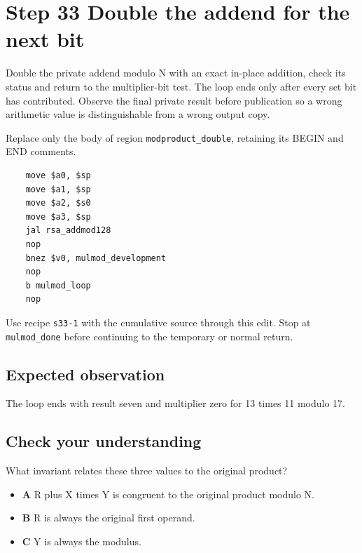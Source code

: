 \section{Step 33 Double the addend for the next bit}\label{rsa-s33}

Double the private addend modulo N with an exact in-place addition, check its status and return to the multiplier-bit test. The loop ends only after every set bit has contributed. Observe the final private result before publication so a wrong arithmetic value is distinguishable from a wrong output copy.

Replace only the body of region \texttt{modproduct\_double}, retaining its BEGIN and END comments.

\begin{verbatim}
    move $a0, $sp
    move $a1, $sp
    move $a2, $s0
    move $a3, $sp
    jal rsa_addmod128
    nop
    bnez $v0, mulmod_development
    nop
    b mulmod_loop
    nop
\end{verbatim}

Use recipe \texttt{s33-1} with the cumulative source through this edit. Stop at \texttt{mulmod\_done} before continuing to the temporary or normal return.

\subsection{Expected observation}
The loop ends with result seven and multiplier zero for 13 times 11 modulo 17.

\subsection{Check your understanding}
What invariant relates these three values to the original product?

\begin{itemize}
  \item \textbf{A} R plus X times Y is congruent to the original product modulo N.
  \item \textbf{B} R is always the original first operand.
  \item \textbf{C} Y is always the modulus.
\end{itemize}
